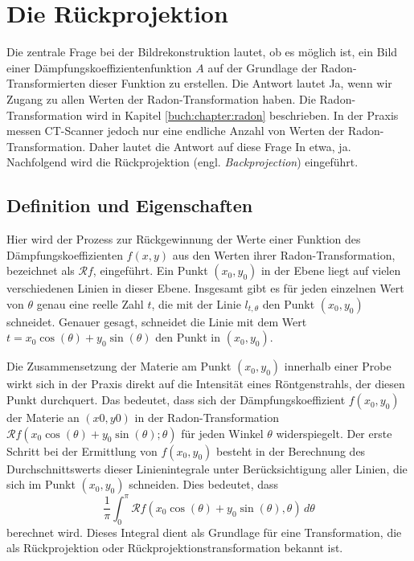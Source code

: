 %
%
%
%
\section{Die Rückprojektion
	\label{ct:section:ruekprojektion}}
Die zentrale Frage bei der Bildrekonstruktion lautet, ob es möglich ist, ein Bild einer Dämpfungskoeffizientenfunktion $A$ auf der Grundlage der Radon-Transformierten dieser Funktion zu erstellen. Die Antwort lautet \glqq Ja\grqq, wenn wir Zugang zu allen Werten der Radon-Transformation haben. Die Radon-Transformation wird in Kapitel \ref{buch:chapter:radon} beschrieben. In der Praxis messen CT-Scanner jedoch nur eine endliche Anzahl von Werten der Radon-Transformation. Daher lautet die Antwort auf diese Frage \glqq In etwa, ja\grqq. Nachfolgend wird die Rückprojektion (engl. \emph{Backprojection}) eingeführt.  

\subsection{Definition und Eigenschaften
	\label{ct:subsection:defnprop}}
Hier wird der Prozess zur Rückgewinnung der Werte einer Funktion des Dämpfungskoeffizienten $f(x, y)$ aus den Werten ihrer Radon-Transformation, bezeichnet als $\mathscr{R}f$, eingeführt. Ein Punkt $(x_0, y_0)$ in der Ebene liegt auf vielen verschiedenen Linien in dieser Ebene. Insgesamt gibt es für jeden einzelnen Wert von $\theta$ genau eine reelle Zahl $t$, die mit der Linie $l_{t,\theta}$ den Punkt $(x_0, y_0)$ schneidet. Genauer gesagt, schneidet die Linie mit dem Wert $t = x_0\cos(\theta) + y_0\sin(\theta)$ den Punkt in $(x_0, y_0)$.  

Die Zusammensetzung der Materie am Punkt $(x_0, y_0)$ innerhalb einer Probe wirkt sich in der Praxis direkt auf die Intensität eines Röntgenstrahls, der diesen Punkt durchquert. Das bedeutet, dass sich der Dämpfungskoeffizient $f(x_0, y_0)$ der Materie an $(x0, y0)$ in der Radon-Transformation $\mathscr{R}f(x_0\cos(\theta) + y_0\sin(\theta); \theta)$ für jeden Winkel $\theta$ widerspiegelt. Der erste Schritt bei der Ermittlung von $f(x_0, y_0)$ besteht in der Berechnung des Durchschnittswerts dieser Linienintegrale unter Berücksichtigung aller Linien, die sich im Punkt $(x_0, y_0)$ schneiden. Dies bedeutet, dass
\begin{equation}
	\dfrac{1}{\pi}\int_{0}^{\pi} \mathscr{R}f(x_0\cos(\theta) + y_0\sin(\theta), \theta) \,d\theta
\end{equation}
berechnet wird. Dieses Integral dient als Grundlage für eine Transformation, die als Rückprojektion oder Rückprojektionstransformation bekannt ist.

